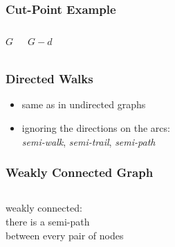 \documentclass[dvipsnames]{beamer}
\begin{document}
\begin{frame}
  \frametitle{Cut-Point Example}

  \begin{columns}
    \begin{block}{$G$}
      \begin{center}
      \end{center}
    \end{block}

    \begin{block}{$G - d$}
      \begin{center}
      \end{center}
    \end{block}
  \end{columns}
\end{frame}

\begin{frame}
  \frametitle{Directed Walks}

  \begin{itemize}
    \item same as in undirected graphs
    \item ignoring the directions on the arcs:\\
      \emph{semi-walk}, \emph{semi-trail}, \emph{semi-path}
  \end{itemize}
\end{frame}

\begin{frame}
  \frametitle{Weakly Connected Graph}

  \begin{columns}
    \begin{definition}
      \alert{weakly} connected:\\
      there is a semi-path\\
      between every pair of nodes
    \end{definition}

    \begin{example}
      \begin{center}
      \end{center}
    \end{example}
  \end{columns}
\end{frame}
\end{document}
